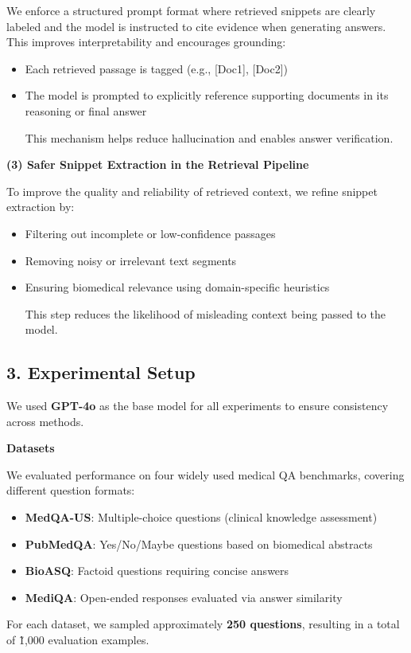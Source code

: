 \documentclass{article}
\begin{document}
 We enforce a structured prompt format where retrieved snippets are clearly labeled and the model is instructed to cite evidence when generating answers. This improves interpretability and encourages grounding:

\begin{itemize}
    \item Each retrieved passage is tagged (e.g., [Doc1], [Doc2]) 
    \item The model is prompted to explicitly reference supporting documents in its reasoning or final answer

 This mechanism helps reduce hallucination and enables answer verification. 
\end{itemize}
\textbf{(3) Safer Snippet Extraction in the Retrieval Pipeline}

 To improve the quality and reliability of retrieved context, we refine snippet extraction by:

\begin{itemize}
    \item Filtering out incomplete or low-confidence passages 
    \item Removing noisy or irrelevant text segments 
    \item Ensuring biomedical relevance using domain-specific heuristics

 This step reduces the likelihood of misleading context being passed to the model. 
\end{itemize}


\subsection{3. Experimental Setup}

We used \textbf{GPT-4o} as the base model for all experiments to ensure consistency across methods.

\textbf{Datasets}

 We evaluated performance on four widely used medical QA benchmarks, covering different question formats:

\begin{itemize}
    \item \textbf{MedQA-US}: Multiple-choice questions (clinical knowledge assessment) 
    \item \textbf{PubMedQA}: Yes/No/Maybe questions based on biomedical abstracts 
    \item \textbf{BioASQ}: Factoid questions requiring concise answers 
    \item \textbf{MediQA}: Open-ended responses evaluated via answer similarity 
\end{itemize}
For each dataset, we sampled approximately \textbf{250 questions}, resulting in a total of \~1,000 evaluation examples.
\end{document}
